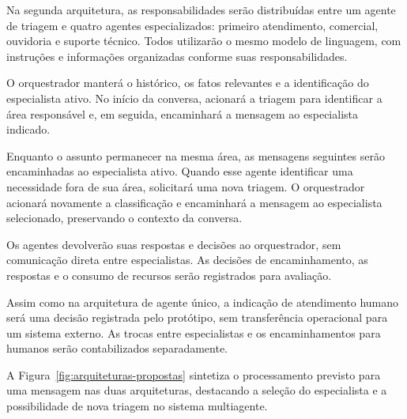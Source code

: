 Na segunda arquitetura, as responsabilidades serão distribuídas
entre um agente de triagem e quatro agentes especializados:
primeiro atendimento, comercial, ouvidoria e suporte técnico.
Todos utilizarão o mesmo modelo de linguagem, com instruções
e informações organizadas conforme suas responsabilidades.

O orquestrador manterá o histórico, os fatos relevantes e a
identificação do especialista ativo. No início da conversa,
acionará a triagem para identificar a área responsável e,
em seguida, encaminhará a mensagem ao especialista indicado.

Enquanto o assunto permanecer na mesma área, as mensagens
seguintes serão encaminhadas ao especialista ativo. Quando
esse agente identificar uma necessidade fora de sua área,
solicitará uma nova triagem. O orquestrador acionará novamente
a classificação e encaminhará a mensagem ao especialista
selecionado, preservando o contexto da conversa.

Os agentes devolverão suas respostas e decisões ao orquestrador,
sem comunicação direta entre especialistas. As decisões de
encaminhamento, as respostas e o consumo de recursos serão
registrados para avaliação.

Assim como na arquitetura de agente único, a indicação de
atendimento humano será uma decisão registrada pelo protótipo,
sem transferência operacional para um sistema externo.
As trocas entre especialistas e os encaminhamentos para humanos
serão contabilizados separadamente.

A Figura~\ref{fig:arquiteturas-propostas} sintetiza o processamento
previsto para uma mensagem nas duas arquiteturas, destacando
a seleção do especialista e a possibilidade de nova triagem
no sistema multiagente.

